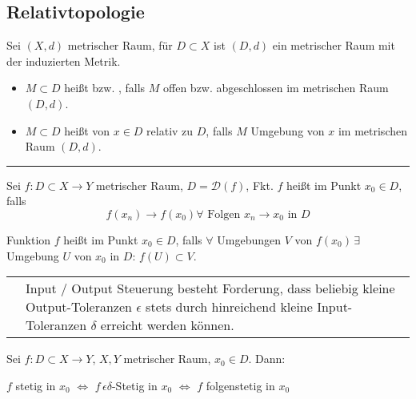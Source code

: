 \subsection*{Relativtopologie}
\begin{definition}
	Sei $(X,d)$ metrischer Raum, für $D\subset X$ ist $(D,d)$ ein metrischer Raum mit der induzierten Metrik.
	\begin{itemize}
		\item $M\subset D$ heißt  bzw.  , falls $M$ offen bzw. abgeschlossen im metrischen Raum $(D,d)$.
		\item $M\subset D$ heißt  von $x\in D$ relativ zu $D$, falls $M$ Umgebung von $x$ im metrischen Raum $(D,d)$.
	\end{itemize}
\end{definition}
\rule{4cm}{0.4pt}
\begin{definition}
	Sei $f:D\subset X\to Y$ metrischer Raum, $D=\mathcal{D}(f)$, Fkt. $f$ heißt  im Punkt $x_0\in D$, falls \[ f(x_n)\to f(x_0) \forall \text{ Folgen $x_n\to x_0$ in $D$} \]
\end{definition}
\begin{definition}
	Funktion $f$ heißt  im Punkt $x_0\in D$, falls $\forall $ Umgebungen $V$ von $f(x_0)\,\exists $ Umgebung $U$ von $x_0$ in $D:\,f(U)\subset V$.
	
	\begin{tabularx}{\textwidth}{lX}
		\noindent\highlight{Interpretation:} & Input / Output Steuerung besteht Forderung, dass beliebig kleine Output-Toleranzen $\epsilon$ stets durch hinreichend kleine Input-Toleranzen $\delta$ erreicht werden können.
	\end{tabularx}
\end{definition}

\begin{proposition}
	Sei $f:D\subset X\to Y$, $X,Y$ metrischer Raum, $x_0\in D$. Dann:
	\begin{center}
		$f$ stetig in $x_0$ $\Leftrightarrow$ $f \,\epsilon\delta$-Stetig in $x_0$ $\Leftrightarrow$ $f$ folgenstetig in $x_0$
	\end{center}
\end{proposition}

